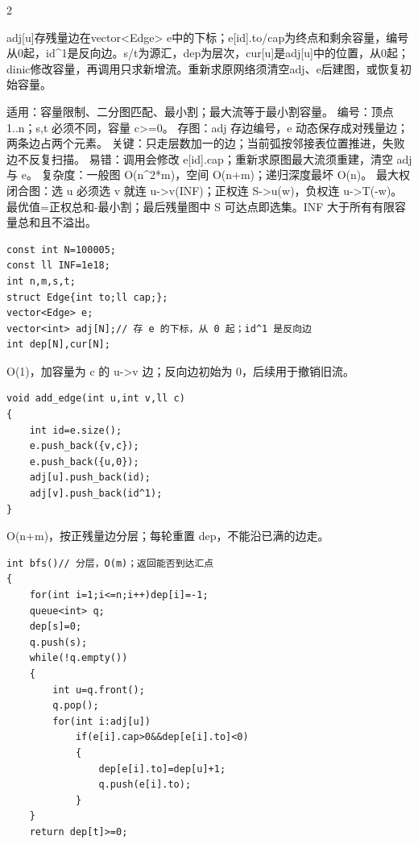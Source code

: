 \documentclass[UTF8,fontset=fandol,a4paper,twoside]{ctexart}
\newcommand{\note}[1]{{\fontsize{10}{12}\selectfont #1\par}}
\begin{document}
\begin{multicols}{2}
\note{adj[\allowbreak{}u]\allowbreak{}存残量边在vector<\allowbreak{}Edge>\allowbreak{} e中的下标；e[\allowbreak{}id]\allowbreak{}.\allowbreak{}to/\allowbreak{}cap为终点和剩余容量，编号从0起，id\textasciicircum{}1是反向边。s/\allowbreak{}t为源汇，dep为层次，cur[\allowbreak{}u]\allowbreak{}是adj[\allowbreak{}u]\allowbreak{}中的位置，从0起；dinic修改容量，再调用只求新增流。重新求原网络须清空adj、e后建图，或恢复初始容量。}
\note{适用：容量限制、二分图匹配、最小割；最大流等于最小割容量。 编号：顶点 1.\allowbreak{}.\allowbreak{}n；s,\allowbreak{}t 必须不同，容量 c>\allowbreak{}=\allowbreak{}0。 存图：adj 存边编号，e 动态保存成对残量边；两条边占两个元素。 关键：只走层数加一的边；当前弧按邻接表位置推进，失败边不反复扫描。 易错：调用会修改 e[\allowbreak{}id]\allowbreak{}.\allowbreak{}cap；重新求原图最大流须重建，清空 adj 与 e。 复杂度：一般图 O(\allowbreak{}n\textasciicircum{}2*m)\allowbreak{}，空间 O(\allowbreak{}n+\allowbreak{}m)\allowbreak{}；递归深度最坏 O(\allowbreak{}n)\allowbreak{}。 最大权闭合图：选 u 必须选 v 就连 u-\allowbreak{}>\allowbreak{}v(\allowbreak{}INF)\allowbreak{}；正权连 S-\allowbreak{}>\allowbreak{}u(\allowbreak{}w)\allowbreak{}，负权连 u-\allowbreak{}>\allowbreak{}T(\allowbreak{}-\allowbreak{}w)\allowbreak{}。 最优值=\allowbreak{}正权总和-\allowbreak{}最小割；最后残量图中 S 可达点即选集。INF 大于所有有限容量总和且不溢出。}
\begin{lstlisting}
const int N=100005;
const ll INF=1e18;
int n,m,s,t;
struct Edge{int to;ll cap;};
vector<Edge> e;
vector<int> adj[N];// 存 e 的下标，从 0 起；id^1 是反向边
int dep[N],cur[N];
\end{lstlisting}
\note{O(\allowbreak{}1)\allowbreak{}，加容量为 c 的 u-\allowbreak{}>\allowbreak{}v 边；反向边初始为 0，后续用于撤销旧流。}
\begin{lstlisting}
void add_edge(int u,int v,ll c)
{
    int id=e.size();
    e.push_back({v,c});
    e.push_back({u,0});
    adj[u].push_back(id);
    adj[v].push_back(id^1);
}
\end{lstlisting}
\note{O(\allowbreak{}n+\allowbreak{}m)\allowbreak{}，按正残量边分层；每轮重置 dep，不能沿已满的边走。}
\begin{lstlisting}
int bfs()// 分层，O(m)；返回能否到达汇点
{
    for(int i=1;i<=n;i++)dep[i]=-1;
    queue<int> q;
    dep[s]=0;
    q.push(s);
    while(!q.empty())
    {
        int u=q.front();
        q.pop();
        for(int i:adj[u])
            if(e[i].cap>0&&dep[e[i].to]<0)
            {
                dep[e[i].to]=dep[u]+1;
                q.push(e[i].to);
            }
    }
    return dep[t]>=0;

\end{lstlisting}
\end{multicols}
\end{document}
